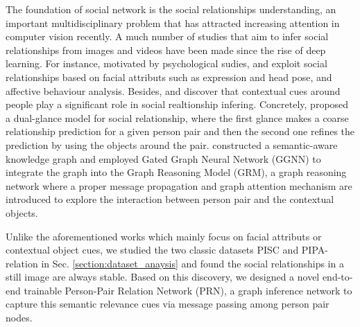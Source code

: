 \documentclass{article}
\begin{document}
The foundation of social network is the social relationships understanding, an important multidisciplinary problem that has attracted increasing attention in computer vision recently. A much number of studies that aim to infer social relationships from images \cite{DBLP:conf/ijcai/WangWG15,DBLP:conf/iccv/LiWZK17,DBLP:conf/ijcai/WangCRYCL18,DBLP:conf/eccv/WangGLF10,DBLP:conf/iccv/ZhangLLT15} and videos \cite{DBLP:conf/eccv/DingY10,DBLP:conf/cvpr/RamanathanY013,DBLP:journals/ivc/VinciarelliPB09} have been made since the rise of deep learning. For instance, motivated by psychological sudies, \cite{DBLP:conf/iccv/ZhangLLT15} and \cite{DBLP:conf/iccv/DibekliogluSG13} exploit social relationships based on facial attributs such as expression and head pose, and affective behaviour analysis. Besides, \cite{DBLP:conf/iccv/LiWZK17} and \cite{DBLP:conf/ijcai/WangCRYCL18} discover that contextual cues around people play a significant role in social realtionship infering. Concretely, \cite{DBLP:conf/iccv/LiWZK17} proposed a dual-glance model for social relationship, where the first glance makes a coarse relationship prediction for a given person pair and then the second one refines the prediction by using the objects around the pair. \cite{DBLP:conf/ijcai/WangCRYCL18} constructed a semantic-aware knowledge graph and employed Gated Graph Neural Network (GGNN) \cite{DBLP:journals/tomccap/LiSKJZW15} to integrate the graph into the Graph Reasoning Model (GRM), a graph reasoning network where a proper message propagation and graph attention mechanism are introduced to explore the interaction between person pair and the contextual objects.

Unlike the aforementioned works which mainly focus on facial attributs or contextual object cues, we studied the two classic datasets PISC \cite{DBLP:conf/iccv/LiWZK17} and PIPA-relation \cite{DBLP:conf/cvpr/SunSF17} in Sec. \ref{section:dataset_anaysis} and found the social relationships in a still image are always stable. Based on this discovery, we designed a novel end-to-end trainable Person-Pair Relation Network (PRN), a graph inference network to capture this semantic relevance cues via message passing among person pair nodes.
\end{document}
